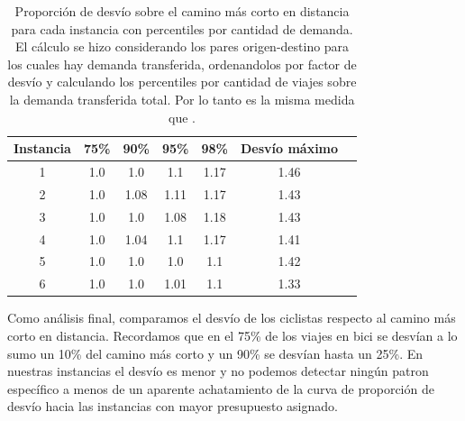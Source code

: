 \begin{table}[h!]
  \centering
  \begin{tabular}{ccccccc}
    \toprule
      Instancia & 75\% & 90\% & 95\% & 98\% & Desvío máximo \\
    \midrule
      1 & 1.0 & 1.0 & 1.1 & 1.17 & 1.46 \\
      2 & 1.0 & 1.08 & 1.11 & 1.17 & 1.43 \\
      3 & 1.0 & 1.0 & 1.08 & 1.18 & 1.43 \\
      4 & 1.0 & 1.04 & 1.1 & 1.17 & 1.41 \\
      5 & 1.0 & 1.0 & 1.0 & 1.1 & 1.42 \\
      6 & 1.0 & 1.0 & 1.01 & 1.1 & 1.33 \\
    \bottomrule
  \end{tabular}
  \caption{Proporción de desvío sobre el camino más corto en distancia para cada instancia con percentiles por cantidad de demanda. El cálculo se hizo considerando los pares origen-destino para los cuales hay demanda transferida, ordenandolos por factor de desvío y calculando los percentiles por cantidad de viajes sobre la demanda transferida total. Por lo tanto es la misma medida que \cite{winters2010}.}
  \label{table:montevideoshortestpathdeviation}
\end{table}

Como análisis final, comparamos el desvío de los ciclistas respecto al camino más corto en distancia. Recordamos que en \cite{winters2010} el 75\% de los viajes en bici se desvían a lo sumo un 10\% del camino más corto y un 90\% se desvían hasta un 25\%. En nuestras instancias el desvío es menor y no podemos detectar ningún patron específico a menos de un aparente achatamiento de la curva de proporción de desvío hacia las instancias con mayor presupuesto asignado.

